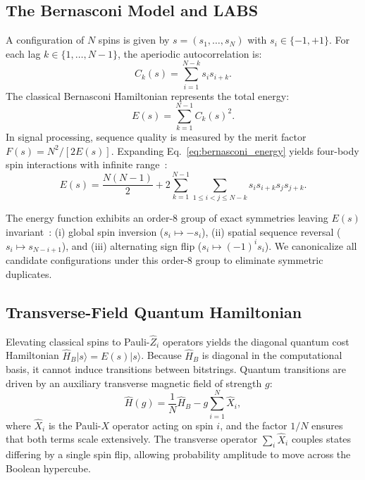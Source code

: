 \documentclass[10pt,twocolumn,a4paper]{article}
\begin{document}
\subsection{The Bernasconi Model and LABS}
A configuration of $N$ spins is given by $s = (s_1, \dots, s_N)$ with $s_i \in \{-1, +1\}$. For each lag $k \in \{1, \dots, N-1\}$, the aperiodic autocorrelation is:
\begin{equation}
    C_k(s) = \sum_{i=1}^{N-k} s_i s_{i+k}.
    \label{eq:autocorrelation}
\end{equation}
The classical Bernasconi Hamiltonian represents the total energy:
\begin{equation}
    E(s) = \sum_{k=1}^{N-1} C_k(s)^2.
    \label{eq:bernasconi_energy}
\end{equation}
In signal processing, sequence quality is measured by the merit factor $F(s) = N^2 / [2E(s)]$. Expanding Eq.~\eqref{eq:bernasconi_energy} yields four-body spin interactions with infinite range~\cite{mertens1998, packebusch2016, marinari1994}:
\begin{equation}
    E(s) = \frac{N(N-1)}{2} + 2 \sum_{k=1}^{N-1} \sum_{1 \le i < j \le N-k} s_i s_{i+k} s_j s_{j+k}.
    \label{eq:expanded_energy}
\end{equation}

The energy function exhibits an order-$8$ group of exact symmetries leaving $E(s)$ invariant~\cite{packebusch2016}:
(i) global spin inversion ($s_i \mapsto -s_i$),
(ii) spatial sequence reversal ($s_i \mapsto s_{N-i+1}$), and
(iii) alternating sign flip ($s_i \mapsto (-1)^i s_i$).
We canonicalize all candidate configurations under this order-$8$ group to eliminate symmetric duplicates.

\subsection{Transverse-Field Quantum Hamiltonian}
Elevating classical spins to Pauli-$\hat{Z}_i$ operators yields the diagonal quantum cost Hamiltonian $\hat{H}_B |s\rangle = E(s)|s\rangle$. Because $\hat{H}_B$ is diagonal in the computational basis, it cannot induce transitions between bitstrings. Quantum transitions are driven by an auxiliary transverse magnetic field of strength $g$:
\begin{equation}
    \hat{H}(g) = \frac{1}{N}\hat{H}_B - g \sum_{i=1}^N \hat{X}_i,
    \label{eq:transverse_hamiltonian}
\end{equation}
where $\hat{X}_i$ is the Pauli-$X$ operator acting on spin $i$, and the factor $1/N$ ensures that both terms scale extensively. The transverse operator $\sum_i \hat{X}_i$ couples states differing by a single spin flip, allowing probability amplitude to move across the Boolean hypercube.
\end{document}

